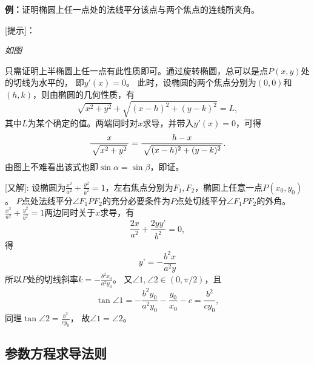 \begin{shaded}
	{\bf 例：}证明椭圆上任一点处的法线平分该点与两个焦点的连线所夹角。

	[提示]：{\it 如图
	\begin{center}
	\end{center}
	只需证明上半椭圆上任一点有此性质即可。通过旋转椭圆，总可以是点$P(x,y)$处的切线为水平的，
	即$y'(x)=0$。
	此时，设椭圆的两个焦点分别为$(0,0)$和$(h,k)$，则由椭圆的几何性质，有
	$$\sqrt{x^2+y^2}+\sqrt{(x-h)^2+(y-k)^2}=L,$$
	其中$L$为某个确定的值。两端同时对$x$求导，并带入$y'(x)=0$，可得
	$$\displaystyle\frac{\,{x}\,}{\,{\sqrt{x^2+y^2}}\,}=\displaystyle\frac{\,{h-x}\,}{\,{\sqrt{(x-h)^2+(y-k)^2}}\,}.$$
	由图上不难看出该式也即$\sin\alpha=\sin\beta$，即证。}
		
[又解]:
设椭圆为$\frac{x^2}{a^2}+\frac{y^2}{b^2}=1$，左右焦点分别为$F_1,F_2$，椭圆上任意一点$P(x_0,y_0)$。
$P$点处法线平分$\angle F_1PF_2$的充分必要条件为$P$点处切线平分$\angle F_1PF_2$的外角。
$\frac{x^2}{a^2}+\frac{y^2}{b^2}=1$两边同时关于$x$求导，有
$$\frac{2x}{a^2}+\frac{2yy’}{b^2}=0,$$
得
$$y’=-\frac{b^2x}{a^2y}$$
所以$P$处的切线斜率$k=-\frac{b^2x_0}{a^2y_0}$。
又$\angle 1,\angle 2\in(0,\pi/2)$，且
$$\tan\angle 1=-\frac{b^2y_0}{a^2y_0}-\frac{y_0}{x_0}-c=\frac{b^2}{cy_0},$$
同理$\tan\angle 2= \frac{b^2}{cy_0}$，
故$\angle 1=\angle 2$。

\end{shaded}

\subsection{参数方程求导法则}

